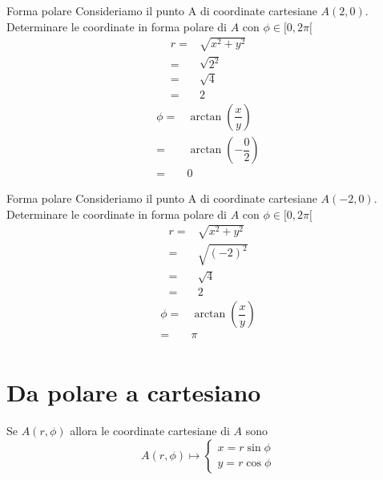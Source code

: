 \begin{esempiot}{Forma polare}{} Consideriamo il punto A di coordinate cartesiane $A(2,0)$. Determinare le coordinate in forma polare di $A$ con $\phi\in[0,2\pi[$
	\begin{align*}
	r=&\sqrt{x^2+y^2}\\
	=&\sqrt{2^2}\\
	=&\sqrt{4}\\
	=&2
	\end{align*}
	\begin{align*}
	\phi=&\arctan\left(\dfrac{x}{y}\right)\\
	=&\arctan\left(-\dfrac{0}{2}\right)\\
	=&0
	\end{align*}
\end{esempiot}
\begin{esempiot}{Forma polare}{} Consideriamo il punto A di coordinate cartesiane $A(-2,0)$. Determinare le coordinate in forma polare di $A$ con $\phi\in[0,2\pi[$
	\begin{align*}
	r=&\sqrt{x^2+y^2}\\
	=&\sqrt{(-2)^2}\\
	=&\sqrt{4}\\
	=&2
	\end{align*}
	\begin{align*}
	\phi=&\arctan\left(\dfrac{x}{y}\right)\\
	=&\pi\\
	\end{align*}
\end{esempiot}
\section{Da polare a cartesiano}
Se $A(r,\phi)$ allora le coordinate cartesiane di $A$ sono
\[ A(r,\phi)\mapsto \begin{cases}
x=r\sin\phi\\
y=r\cos\phi 
\end{cases} \]

